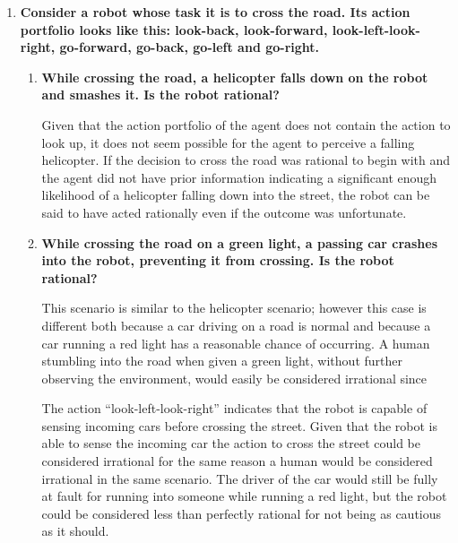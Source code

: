 \begin{enumerate}
\item \textbf{Consider a robot whose task it is to cross the road. Its action portfolio looks like this: look-back, look-forward, look-left-look-right, go-forward, go-back, go-left and go-right.}\nopagebreak

\begin{enumerate}

\item \textbf{While crossing the road, a helicopter falls down on the robot and smashes it. Is the robot rational?}\nopagebreak

Given that the action portfolio of the agent does not contain the action to look up, it does not seem possible for the agent to perceive a falling helicopter. If the decision to cross the road was rational to begin with and the agent did not have prior information indicating a significant enough likelihood of a helicopter falling down into the street, the robot can be said to have acted rationally even if the outcome was unfortunate.

\item \textbf{While crossing the road on a green light, a passing car crashes into the robot, preventing it from crossing. Is the robot rational?}\nopagebreak

This scenario is similar to the helicopter scenario; however this case is different both because a car driving on a road is normal and because a car running a red light has a reasonable chance of occurring. A human stumbling into the road when given a green light, without further observing the environment, would easily be considered irrational since

The action ``look-left-look-right'' indicates that the robot is capable of sensing incoming cars before crossing the street. Given that the robot is able to sense the incoming car the action to cross the street could be considered irrational for the same reason a human would be considered irrational in the same scenario. The driver of the car would still be fully at fault for running into someone while running a red light, but the robot could be considered less than perfectly rational for not being as cautious as it should.


\end{enumerate}
\end{enumerate}
